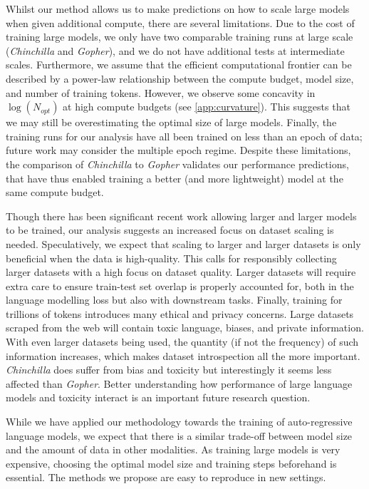 Whilst our method allows us to make predictions on how to scale large models when given additional compute, there are several limitations. Due to the cost of training large models, we only have two comparable training runs at large scale (\textit{Chinchilla} and \textit{Gopher}), and we do not have additional tests at intermediate scales. Furthermore, we assume that the efficient computational frontier can be described by a power-law relationship between the compute budget, model size, and number of training tokens. However, we observe some concavity in $\log \left (N_{opt} \right)$ at high compute budgets (see \autoref{app:curvature}).
This suggests that we may still be overestimating the optimal size of large models. Finally, the training runs for our analysis have all been trained on less than an epoch of data; future work may consider the multiple epoch regime. Despite these limitations, the comparison of \textit{Chinchilla} to \textit{Gopher} validates our performance predictions, that have thus enabled training a better (and more lightweight) model at the same compute budget.

Though there has been significant recent work allowing larger and larger models to be trained, our analysis suggests an increased focus on dataset scaling is needed. Speculatively, we expect that scaling to larger and larger datasets is only beneficial when the data is high-quality. This calls for responsibly collecting larger datasets with a high focus on dataset quality. Larger datasets will require extra care to ensure train-test set overlap is properly accounted for, both in the language modelling loss but also with downstream tasks. Finally, training for trillions of tokens introduces many ethical and privacy concerns. Large datasets scraped from the web will contain toxic language, biases, and private information. With even larger datasets being used, the quantity (if not the frequency) of such information increases, which makes dataset introspection all the more important.
\textit{Chinchilla} does suffer from bias and toxicity but interestingly it seems less affected than \textit{Gopher}. 
Better understanding how performance of large language models and toxicity interact is an important future research question.

While we have applied our methodology towards the training of auto-regressive language models, we expect that there is a similar trade-off between model size and the amount of data in other modalities. As training large models is very expensive, choosing the optimal model size and training steps beforehand is essential. The methods we propose are easy to reproduce in new settings.


